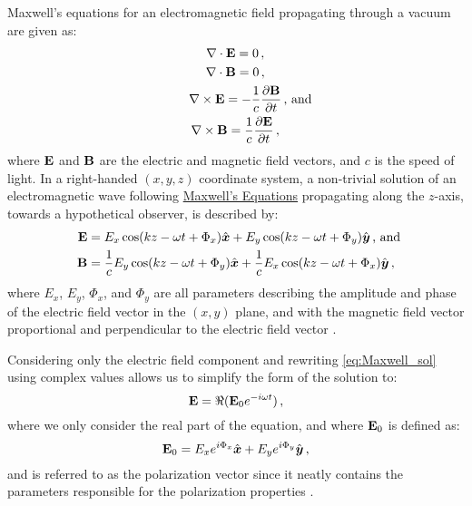 Maxwell's equations for an electromagnetic field propagating through a vacuum are given as:
\begin{equation} \label{eq:Maxwell}
    \begin{gathered}
        \nabla \cdot \matr{E} = 0 \,,\\
        \nabla \cdot \matr{B} = 0 \,,\\
        \nabla \times \matr{E} = - \frac{1}{c} \frac{\partial \matr{B}}{\partial t} \rlap{\,,\ and}\\
        \nabla \times \matr{B} = \frac{1}{c} \frac{\partial \matr{E}}{\partial t}\,,
    \end{gathered}
\end{equation}
where $\mathbf{E}$ and $\mathbf{B}$ are the electric and magnetic field vectors, and $c$ is the speed of light.
In a right-handed $(x, y, z)$ coordinate system, a non-trivial solution of an electromagnetic wave following \hyperref[eq:Maxwell]{Maxwell's Equations} propagating along the $z$-axis, towards a hypothetical observer, is described by:
\begin{equation} \label{eq:Maxwell_sol}
    \begin{aligned}
        \matr{E} &= E_{x} \cos(kz - \omega t + \Phi_{x}) \hat{\boldsymbol{x}} +
        E_{y} \cos(kz - \omega t + \Phi_{y}) \hat{\boldsymbol{y}} \rlap{\,,\ and}\\
        \matr{B} &= \frac{1}{c} E_{y} \cos(kz - \omega t + \Phi_{y}) \hat{\boldsymbol{x}} +
        \frac{1}{c} E_{x} \cos(kz - \omega t + \Phi_{x}) \hat{\boldsymbol{y}}\,,
    \end{aligned}
\end{equation}
where $E_{x}$, $E_{y}$, $\Phi_{x}$, and $\Phi_{y}$ are all parameters describing the amplitude and phase of the electric field vector in the $(x, y)$ plane, and with the magnetic field vector proportional and perpendicular to the electric field vector \citep{Griffiths}.

Considering only the electric field component and rewriting \autoref{eq:Maxwell_sol} using complex values allows us to simplify the form of the solution to:
\begin{equation} \label{eq:E_field_vector}
    \mathbf{E} = \Re(\mathbf{E}_{0} e^{-i \omega t})\,,
\end{equation}
where we only consider the real part of the equation, and where $\mathbf{E}_{0}$ is defined as:
\begin{equation} \label{eq:pol_vector}
    \mathbf{E}_{0} = E_{x} e^{i \Phi_{x}} \hat{\boldsymbol{x}} +
    E_{y} e^{i \Phi_{y}} \hat{\boldsymbol{y}}\,,
\end{equation}
and is referred to as the polarization vector since it neatly contains the parameters responsible for the polarization properties \citep{pol_phys}.

